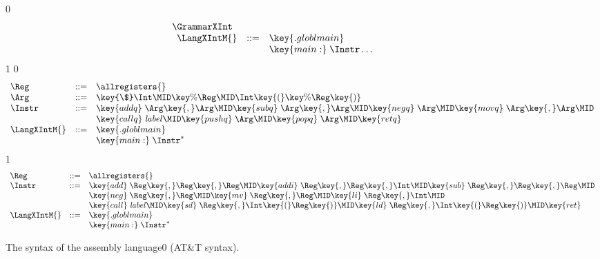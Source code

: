 \documentclass[7x10]{TimesAPriori_MIT}%
\def\racketEd{0}
\def\pythonEd{1}
\def\edition{1}
\def\xeightysixEd{0}
\def\riscvEd{1}
\def\architecture{1}
\newcommand\ifxeightsix[1]{\if\architecture\xeightysixEd{#1}\fi}
\newcommand{\pythonColor}[0]{}
\numberwithin{theorem}{chapter}
\numberwithin{definition}{chapter}
\numberwithin{equation}{chapter}
\begin{document}
\begin{figure}[tp]
\begin{tcolorbox}[colback=white]
{\if\edition\racketEd    
\[
\begin{array}{l}
  \GrammarXInt \\
\begin{array}{lcl}
\LangXIntM{} &::= & \key{.globl main}\\
      &    & \key{main:} \; \Instr\ldots
\end{array}
\end{array}
\]
\fi}
{\if\edition\pythonEd\pythonColor
\if\architecture\xeightysixEd
\[
\begin{array}{lcl}
\Reg &::=& \allregisters{} \\
\Arg &::=&  \key{\$}\Int \MID \key{\%}\Reg \MID \Int\key{(}\key{\%}\Reg\key{)}\\
\Instr &::=& \key{addq} \; \Arg\key{,} \Arg \MID
      \key{subq} \; \Arg\key{,} \Arg \MID
      \key{negq} \; \Arg \MID \key{movq} \; \Arg\key{,} \Arg \MID \\
  &&  \key{callq} \; \mathit{label} \MID
      \key{pushq}\;\Arg \MID \key{popq}\;\Arg \MID \key{retq} \\
\LangXIntM{} &::= & \key{.globl main}\\
      &    & \key{main:} \; \Instr^{*}
\end{array}
\]
\fi
\if\architecture\riscvEd
\[
\begin{array}{lcl}
\Reg &::=& \allregisters{} \\
  \Instr &::=&
               \key{add} \; \Reg\key{,} \Reg\key{,} \Reg \MID
               \key{addi} \; \Reg\key{,} \Reg\key{,} \Int \MID
               \key{sub}  \; \Reg\key{,} \Reg\key{,} \Reg \MID \\ &&
               \key{neg}  \; \Reg\key{,} \Reg \MID
               \key{mv} \; \Reg\key{,} \Reg \MID
               \key{li} \; \Reg\key{,} \Int \MID
  \\
  &&  \key{call} \; \mathit{label} \MID
     \key{sd}\;\Reg\key{,}\Int\key{(}\Reg\key{)} \MID
     \key{ld}\;\Reg\key{,}\Int\key{(}\Reg\key{)} \MID \key{ret} \\
\LangXIntM{} &::= & \key{.globl main}\\
      &    & \key{main:} \; \Instr^{*}
\end{array}
\]
\fi
\fi}
\end{tcolorbox}
\caption{The syntax of the \LangXInt{} assembly language\ifxeightsix{ (AT\&T syntax)}.}
\label{fig:x86-int-concrete}
\end{figure}
\end{document}
